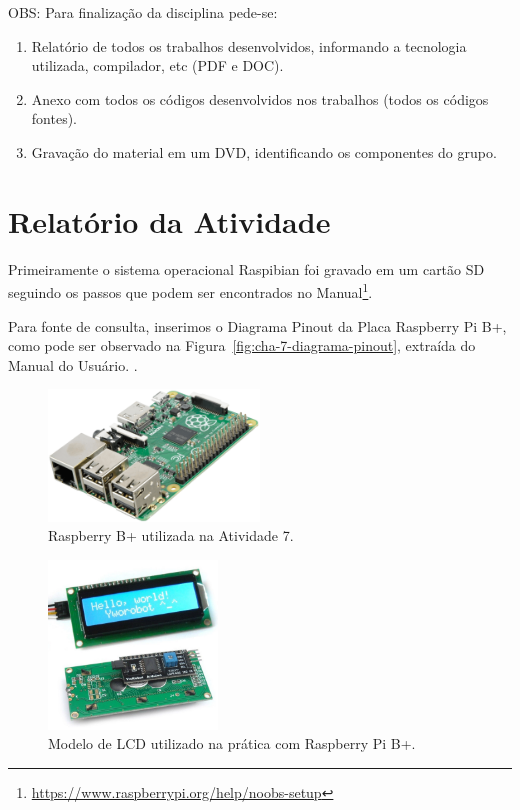 \documentclass[
	12pt,				%
	openright,			%
  oneside,     %
	a4paper,			%
	english,			%
	french,				%
	spanish,			%
	brazil				%
	]{abntex2}
\begin{document}
\noindent OBS: Para finalização da disciplina pede-se:

\begin{enumerate}
  \item Relatório de todos os trabalhos desenvolvidos, informando a tecnologia utilizada, compilador, etc (PDF e DOC).
  \item Anexo com todos os códigos desenvolvidos nos trabalhos (todos os códigos fontes).
  \item Gravação do material em um DVD, identificando os componentes do grupo.
\end{enumerate}


\section{Relatório da Atividade} %
\label{sec:consideracoes-RaspberryPi}

Primeiramente o sistema operacional Raspibian foi gravado em um cartão SD seguindo os passos que podem ser encontrados no Manual\footnote{\url{https://www.raspberrypi.org/help/noobs-setup}}. 

Para fonte de consulta, inserimos o Diagrama Pinout da Placa Raspberry Pi B+, como pode ser observado na Figura~\ref{fig:cha-7-diagrama-pinout}, extraída do Manual do Usuário. \cite{System2015}.

\begin{figure}[!ht]
  \centering
  \caption{\label{fig:RaspberryBPlus}Raspberry B+ utilizada na Atividade 7.}
  \includegraphics[width=0.5\textwidth]{images/Atividade07/RASPBERRY_PI_B_PLUS_02(1).png}
\end{figure}

\begin{figure}[!ht]
  \centering
  \caption{\label{fig:03e04DisplayLCD}Modelo de LCD utilizado na prática com Raspberry Pi B+.}
  \includegraphics[width=0.4\textwidth]{images/Atividade07/03e04DisplayLCD.jpg}
\end{figure}
\end{document}
